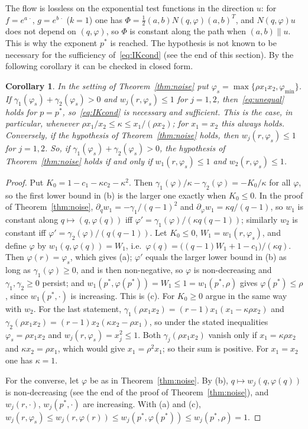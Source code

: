 \documentclass[11pt]{amsart}
\newtheorem{corollary}[theorem]{Corollary}
\theoremstyle{definition}
\begin{document}
The flow is lossless on the exponential test functions in the direction $u$: for $f=e^{a\,\cdot}$, $g=e^{b\,\cdot}$
($k=1$) one has $\Phi=\frac12(a,b)N(q,\varphi)(a,b)^T$, and $N(q,\varphi)u$ does not depend on $(q,\varphi)$, so $\Phi$
is constant along the path when $(a,b)\parallel u$. This is why the exponent $p^*$ is reached. The hypothesis is not
known to be necessary for the sufficiency of~\eqref{eq:IKcond} (see the end of this section). By the following
corollary it can be checked in closed form.

\begin{corollary}\label{cor:noise}
In the setting of Theorem~\ref{thm:noise} put $\varphi_s=\max\{\rho x_1x_2,\varphi_{\min}\}$. If
$\gamma_1(\varphi_s)+\gamma_2(\varphi_s)>0$ and $w_j(r,\varphi_s)\le1$ for $j=1,2$, then~\eqref{eq:unequal} holds for
$p=p^*$, so~\eqref{eq:IKcond} is necessary and sufficient. This is the case, in particular, whenever
$\rho x_1/x_2\le\kappa\le x_1/(\rho x_2)$; for $x_1=x_2$ this
always holds. Conversely, if the hypothesis of Theorem~\ref{thm:noise} holds, then $w_j(r,\varphi_s)\le1$ for $j=1,2$.
So, if $\gamma_1(\varphi_s)+\gamma_2(\varphi_s)>0$, the hypothesis of Theorem~\ref{thm:noise} holds if and only if
$w_1(r,\varphi_s)\le1$ and $w_2(r,\varphi_s)\le1$.
\end{corollary}

\begin{proof}
Put $K_0=1-c_1-\kappa c_2-\kappa^2$. Then $\gamma_1(\varphi)/\kappa-\gamma_2(\varphi)=-K_0/\kappa$ for all $\varphi$, so the
first lower bound in (b) is the larger one exactly when $K_0\le0$. In the proof of Theorem~\ref{thm:noise},
$\partial_qw_1=-\gamma_1/(q-1)^2$ and $\partial_\varphi w_1=\kappa q/(q-1)$, so $w_1$ is constant along $q\mapsto(q,\varphi(q))$
iff $\varphi'=\gamma_1(\varphi)/(\kappa q(q-1))$; similarly $w_2$ is constant iff $\varphi'=\gamma_2(\varphi)/(q(q-1))$. Let
$K_0\le0$, $W_1=w_1(r,\varphi_s)$, and define $\varphi$ by $w_1(q,\varphi(q))=W_1$, i.e.\
$\varphi(q)=\big((q-1)W_1+1-c_1\big)/(\kappa q)$. Then $\varphi(r)=\varphi_s$, which gives (a); $\varphi'$ equals the
larger lower bound in (b) as long as $\gamma_1(\varphi)\ge0$, and is then non-negative, so $\varphi$ is non-decreasing and
$\gamma_1,\gamma_2\ge0$ persist; and $w_1(p^*,\varphi(p^*))=W_1\le1=w_1(p^*,\rho)$ gives $\varphi(p^*)\le\rho$, since
$w_1(p^*,\cdot)$ is increasing. This is (c). For $K_0\ge0$ argue in the same way with $w_2$. For the last statement,
$\gamma_1(\rho x_1x_2)=(r-1)x_1(x_1-\kappa\rho x_2)$ and $\gamma_2(\rho x_1x_2)=(r-1)x_2(\kappa x_2-\rho x_1)$, so under the
stated inequalities $\varphi_s=\rho x_1x_2$ and $w_j(r,\varphi_s)=x_j^2\le1$. Both $\gamma_j(\rho x_1x_2)$ vanish only if
$x_1=\kappa\rho x_2$ and $\kappa x_2=\rho x_1$, which would give $x_1=\rho^2x_1$; so their sum is positive. For $x_1=x_2$ one has
$\kappa=1$.

For the converse, let $\varphi$ be as in Theorem~\ref{thm:noise}. By (b), $q\mapsto w_j(q,\varphi(q))$ is
non-decreasing (see the end of the proof of Theorem~\ref{thm:noise}), and $w_j(r,\cdot)$, $w_j(p^*,\cdot)$ are
increasing. With (a) and (c),
$w_j(r,\varphi_s)\le w_j(r,\varphi(r))\le w_j(p^*,\varphi(p^*))\le w_j(p^*,\rho)=1$.
\end{proof}
\end{document}
